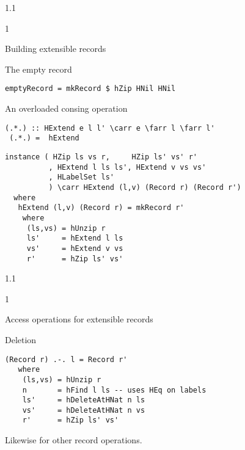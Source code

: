 \documentclass{slides}
\newenvironment{myslide}{\begin{slide}\color{Blue}\begin{boxedminipage}{1.1\hsize}\begin{boxedminipage}{1\hsize}\color{Black}
\vspace{-170\in}
}{%
\smallskip
\end{boxedminipage}
\end{boxedminipage}
\end{slide}}
\newenvironment{myslide}{\begin{slide}
}{%
\end{slide}}
\newenvironment{myslide}{\begin{slide}\color{White}\begin{boxedminipage}{1.1\hsize}\color{Black}
\vspace{-170\in}
}{%
\smallskip
\end{boxedminipage}
\end{slide}}
\newcommand{\header}[1]{{\large \color{Red} #1}}
\newcommand{\blau}[1]{{\vspace{-50\in}\normalsize \color{Blue} #1}}
\newcommand{\farr}{\ensuremath{\to}}
\newcommand{\carr}{\ensuremath{\Rightarrow}}
\begin{document}
\begin{myslide}

\header{Building extensible records}

\vspace{-77\in}

\blau{The empty record}

\smallskip

\begin{Verbatim}[fontfamily=courier,fontsize=\small,commandchars=\\\{\}]
emptyRecord = mkRecord $ hZip HNil HNil
\end{Verbatim}

\vspace{-77\in}

\blau{An overloaded consing operation}

\smallskip

\begin{Verbatim}[fontfamily=courier,fontsize=\small,commandchars=\\\{\}]
 (.*.) :: HExtend e l l' \carr e \farr l \farr l'
 (.*.) =  hExtend
\end{Verbatim}

\smallskip

\begin{Verbatim}[fontfamily=courier,fontsize=\small,commandchars=\\\{\}]
 instance ( HZip ls vs r,     HZip ls' vs' r'
          , HExtend l ls ls', HExtend v vs vs'
          , HLabelSet ls'
          ) \carr HExtend (l,v) (Record r) (Record r')
  where
   hExtend (l,v) (Record r) = mkRecord r'
    where
     (ls,vs) = hUnzip r
     ls'     = hExtend l ls
     vs'     = hExtend v vs
     r'      = hZip ls' vs'
\end{Verbatim}

\end{myslide}






\begin{myslide}

\header{Access operations for extensible records}

\vspace{-77\in}

\blau{Deletion}

\smallskip

\begin{Verbatim}[fontfamily=courier,fontsize=\small,commandchars=\\\{\}]
 (Record r) .-. l = Record r'
   where
    (ls,vs) = hUnzip r
    n       = hFind l ls -- uses HEq on labels
    ls'     = hDeleteAtHNat n ls
    vs'     = hDeleteAtHNat n vs
    r'      = hZip ls' vs'
\end{Verbatim}

\bigskip

Likewise for other record operations.

\end{myslide}
\end{document}
